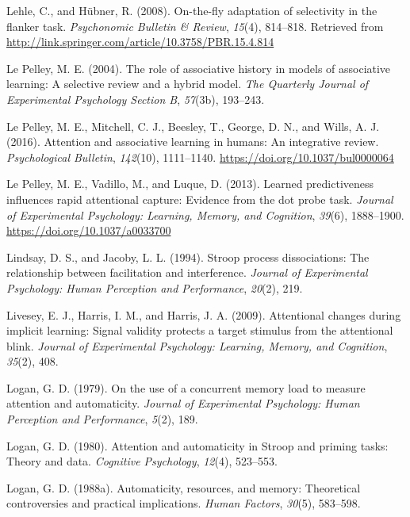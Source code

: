 \documentclass[]{DissertateCUNY}
\begin{document}
\leavevmode\hypertarget{ref-lehle_fly_2008}{}%
Lehle, C., and Hübner, R. (2008). On-the-fly adaptation of selectivity
in the flanker task. \emph{Psychonomic Bulletin \& Review},
\emph{15}(4), 814--818. Retrieved from
\url{http://link.springer.com/article/10.3758/PBR.15.4.814}

\leavevmode\hypertarget{ref-le_pelley_role_2004}{}%
Le Pelley, M. E. (2004). The role of associative history in models of
associative learning: A selective review and a hybrid model. \emph{The
Quarterly Journal of Experimental Psychology Section B}, \emph{57}(3b),
193--243.

\leavevmode\hypertarget{ref-le_pelley_attention_2016}{}%
Le Pelley, M. E., Mitchell, C. J., Beesley, T., George, D. N., and
Wills, A. J. (2016). Attention and associative learning in humans: An
integrative review. \emph{Psychological Bulletin}, \emph{142}(10),
1111--1140. \url{https://doi.org/10.1037/bul0000064}

\leavevmode\hypertarget{ref-le_pelley_learned_2013}{}%
Le Pelley, M. E., Vadillo, M., and Luque, D. (2013). Learned
predictiveness influences rapid attentional capture: Evidence from the
dot probe task. \emph{Journal of Experimental Psychology: Learning,
Memory, and Cognition}, \emph{39}(6), 1888--1900.
\url{https://doi.org/10.1037/a0033700}

\leavevmode\hypertarget{ref-lindsay_stroop_1994}{}%
Lindsay, D. S., and Jacoby, L. L. (1994). Stroop process dissociations:
The relationship between facilitation and interference. \emph{Journal of
Experimental Psychology: Human Perception and Performance},
\emph{20}(2), 219.

\leavevmode\hypertarget{ref-livesey_attentional_2009}{}%
Livesey, E. J., Harris, I. M., and Harris, J. A. (2009). Attentional
changes during implicit learning: Signal validity protects a target
stimulus from the attentional blink. \emph{Journal of Experimental
Psychology: Learning, Memory, and Cognition}, \emph{35}(2), 408.

\leavevmode\hypertarget{ref-logan_use_1979}{}%
Logan, G. D. (1979). On the use of a concurrent memory load to measure
attention and automaticity. \emph{Journal of Experimental Psychology:
Human Perception and Performance}, \emph{5}(2), 189.

\leavevmode\hypertarget{ref-logan_attention_1980}{}%
Logan, G. D. (1980). Attention and automaticity in Stroop and priming
tasks: Theory and data. \emph{Cognitive Psychology}, \emph{12}(4),
523--553.

\leavevmode\hypertarget{ref-logan_automaticity_1988}{}%
Logan, G. D. (1988a). Automaticity, resources, and memory: Theoretical
controversies and practical implications. \emph{Human Factors},
\emph{30}(5), 583--598.
\end{document}
